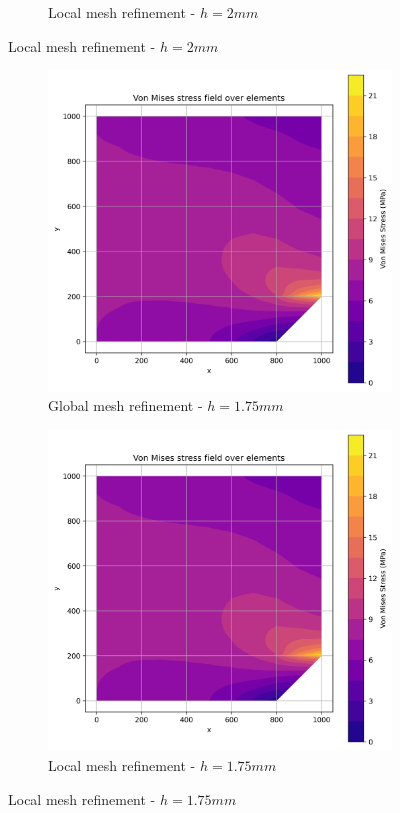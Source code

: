 \begin{figure}[H]
\begin{subfigure}[b]{0.45\textwidth}
    \caption{Local mesh refinement - $h=2mm$}
    \label{fig:img2}
  \end{subfigure}
\end{figure}

\begin{figure}[H]
  \centering
  \begin{subfigure}[b]{0.45\textwidth}
    \centering
    \includegraphics[width=\textwidth]{GRAFICOS/Quad9/1.75mm_global/resultados_von_mises.png}
    \caption{Global mesh refinement - $h=1.75mm$}
    \label{fig:img11}
  \end{subfigure}
  \hfill
  \begin{subfigure}[b]{0.45\textwidth}
    \centering
    \includegraphics[width=\textwidth]{GRAFICOS/Quad9/1.75mm_global/resultados_von_mises.png}
    \caption{Local mesh refinement - $h=1.75mm$}
    \label{fig:img21}
  \end{subfigure}
\end{figure}

